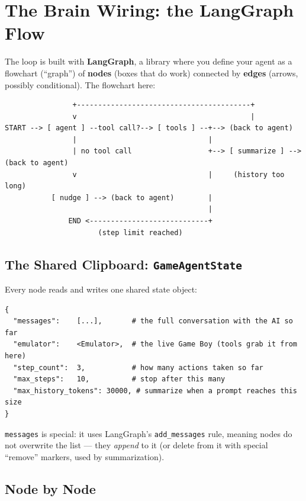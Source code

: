 \documentclass[11pt]{article}
\newcommand{\code}[1]{\texttt{#1}}
\begin{document}
\section{The Brain Wiring: the LangGraph Flow}

The loop is built with \textbf{LangGraph}, a library where you define your agent as a flowchart (``graph'') of \textbf{nodes} (boxes that do work) connected by \textbf{edges} (arrows, possibly conditional). The flowchart here:

\begin{verbatim}
                +-----------------------------------------+
                v                                         |
START --> [ agent ] --tool call?--> [ tools ] --+--> (back to agent)
                |                               |
                | no tool call                  +--> [ summarize ] --> (back to agent)
                v                               |     (history too long)
           [ nudge ] --> (back to agent)        |
                                                |
               END <----------------------------+
                      (step limit reached)
\end{verbatim}

\subsection{The Shared Clipboard: \code{GameAgentState}}

Every node reads and writes one shared state object:

\begin{verbatim}
{
  "messages":    [...],       # the full conversation with the AI so far
  "emulator":    <Emulator>,  # the live Game Boy (tools grab it from here)
  "step_count":  3,           # how many actions taken so far
  "max_steps":   10,          # stop after this many
  "max_history_tokens": 30000, # summarize when a prompt reaches this size
}
\end{verbatim}

\code{messages} is special: it uses LangGraph's \code{add\_messages} rule, meaning nodes do not overwrite the list --- they \emph{append} to it (or delete from it with special ``remove'' markers, used by summarization).

\subsection{Node by Node}
\end{document}
